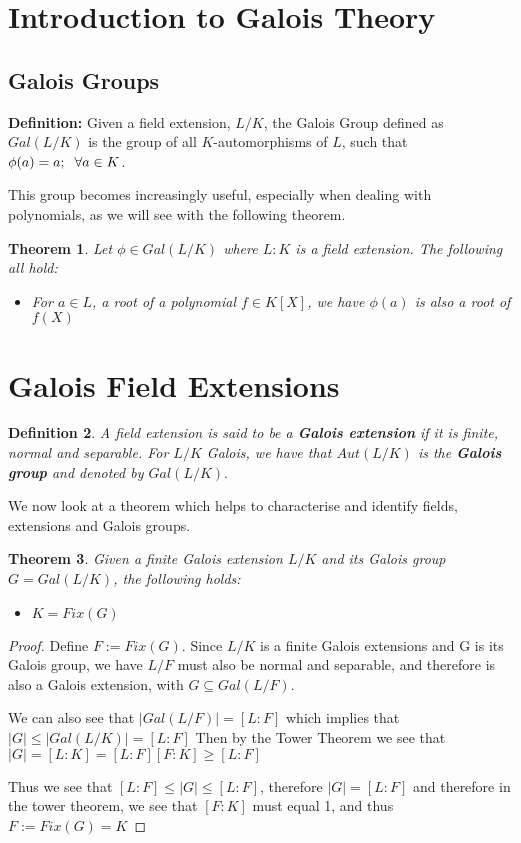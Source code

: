 \documentclass[12pt]{article}
\newtheorem{theorem}{Theorem}
\newtheorem{definition}[theorem]{Definition}
\begin{document}
\section{Introduction to Galois Theory}
\subsection{Galois Groups}
\textbf{Definition:} Given a field extension, $L/K$, the Galois Group defined as $Gal(L/K)$ is the group of all $K$-automorphisms of $L$, such that $\phi(a) = a ; \hspace{0.2cm} \forall a \in K$.

This group becomes increasingly useful, especially when dealing with polynomials, as we will see with the following theorem.

\begin{theorem}
Let $\phi \in Gal(L/K)$ where $L:K$ is a field extension. The following all hold:
\begin{itemize}
    \item For $a \in L$, a root of a polynomial $f \in K[X]$, we have $\phi(a)$ is also a root of $f(X)$
\end{itemize}
\end{theorem}

\section{Galois Field Extensions}
\begin{definition}
A field extension is said to be a \textbf{Galois extension} if it is finite, normal and separable. For $L/K$ Galois, we have that $Aut(L/K)$ is the \textbf{Galois group} and denoted by $Gal(L/K).$
\end{definition}

\noindent We now look at a theorem which helps to characterise and identify fields, extensions and Galois groups.

\begin{theorem}
    Given a finite Galois extension $L/K$ and its Galois group $G=Gal(L/K)$, the following holds:
    \begin{itemize}
        \item $K = Fix(G)$
    \end{itemize}
\end{theorem}

\begin{proof}
    Define $F:=Fix(G)$. Since $L/K$ is a finite Galois extensions and G is its Galois group, we have $L/F$ must also be normal and separable, and therefore is also a Galois extension, with $G \subseteq Gal(L/F)$.

\noindent We can also see that $|Gal(L/F)| = [L:F]$ which implies that $|G|\leq|Gal(L/K)|=[L:F]$
Then by the Tower Theorem we see that $|G|=[L:K]=[L:F][F:K]\geq [L:F]$

Thus we see that $[L:F]\leq|G|\leq[L:F]$, therefore $|G|=[L:F]$ and therefore in the tower theorem, we see that $[F:K]$ must equal 1, and thus $F:=Fix(G) = K$
\end{proof}
\end{document}
